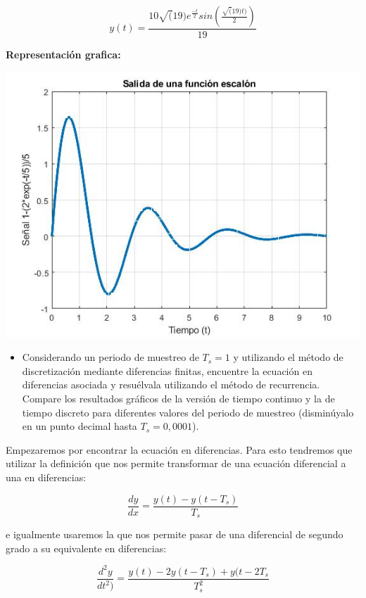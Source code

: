 \begin{equation}
	y(t)=\frac{10\sqrt(19)e^\frac{-t}{2}sin(\frac{\sqrt(19)t)}{2})}{19}
\end{equation}

\noindent\textbf{Representación grafica: }

\noindent \includegraphics[scale=0.6]{./img2/salidaejercicio1}

\begin{itemize}
	\item Considerando un periodo de muestreo de $ T_s = 1 $ y utilizando el método de discretización mediante
	diferencias finitas, encuentre la ecuación en diferencias asociada y resuélvala utilizando el método de recurrencia. Compare los resultados gráficos de la versión de tiempo continuo y la de tiempo discreto para diferentes valores del periodo de muestreo (disminúyalo en un punto decimal hasta $T_s = 0,0001$).
\end{itemize}

Empezaremos por encontrar la ecuación en diferencias. Para esto tendremos que utilizar la definición que nos permite transformar de una ecuación diferencial a una en diferencias:

\begin{equation}
\frac{dy}{dx}=\frac{y(t)-y(t-T_s)}{T_s}
\end{equation}

\noindent e igualmente usaremos la que nos permite pasar de una diferencial de segundo grado a su equivalente en diferencias:

\begin{equation}
\frac{d^2y}{dt^2)}=\frac{y(t)-2y(t-T_s)+y(t-2T_s}{T_s^2}
\end{equation}


